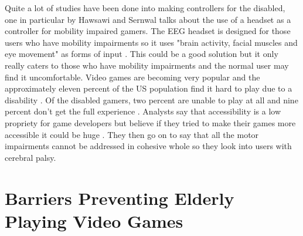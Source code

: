 \documentclass[journal]{IEEEtran}
\begin{document}
Quite a lot of studies have been done into making controllers for the disabled, one in particular by Hawsawi and Sernwal \cite{hawsawi_eeg_2014} talks about the use of a headset as a controller for mobility impaired gamers. The EEG headset is designed for those users who have mobility impairments so it uses "brain activity, facial muscles and eye movement" as forms of input \cite{hawsawi_eeg_2014}. This could be a good solution but it only really caters to those who have mobility impairments and the normal user may find it uncomfortable. Video games are becoming very popular and the approximately eleven percent of the US population find it hard to play due to a disability \cite{hawsawi_eeg_2014}. Of the disabled gamers, two percent are unable to play at all and nine percent don't get the full experience \cite{hawsawi_eeg_2014}. Analysts say that accessibility is a low propriety for game developers but believe if they tried to make their games more accessible it could be huge \cite{hawsawi_eeg_2014}. They then go on to say that all the motor impairments cannot be addressed in cohesive whole so they look into users with cerebral palsy.

\section{Barriers Preventing Elderly Playing Video Games}
\end{document}

